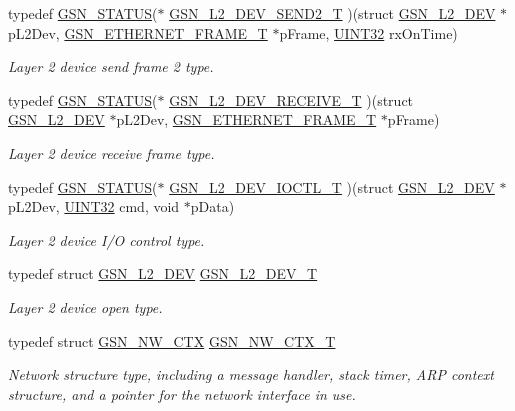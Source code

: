 \begin{DoxyCompactItemize}
typedef \hyperlink{a00660_gada5951904ac6110b1fa95e51a9ddc217}{GSN\_\-STATUS}($\ast$ \hyperlink{a00670_ga6bea88ae2a22023e68f1b064e1455411}{GSN\_\-L2\_\-DEV\_\-SEND2\_\-T} )(struct \hyperlink{a00107}{GSN\_\-L2\_\-DEV} $\ast$pL2Dev, \hyperlink{a00068}{GSN\_\-ETHERNET\_\-FRAME\_\-T} $\ast$pFrame, \hyperlink{a00660_gae1e6edbbc26d6fbc71a90190d0266018}{UINT32} rxOnTime)
\begin{DoxyCompactList}\small\item\em Layer 2 device send frame 2 type. \end{DoxyCompactList}\item 
typedef \hyperlink{a00660_gada5951904ac6110b1fa95e51a9ddc217}{GSN\_\-STATUS}($\ast$ \hyperlink{a00670_gaffd1598183dbe1898e975c2993aa4966}{GSN\_\-L2\_\-DEV\_\-RECEIVE\_\-T} )(struct \hyperlink{a00107}{GSN\_\-L2\_\-DEV} $\ast$pL2Dev, \hyperlink{a00068}{GSN\_\-ETHERNET\_\-FRAME\_\-T} $\ast$pFrame)
\begin{DoxyCompactList}\small\item\em Layer 2 device receive frame type. \end{DoxyCompactList}\item 
typedef \hyperlink{a00660_gada5951904ac6110b1fa95e51a9ddc217}{GSN\_\-STATUS}($\ast$ \hyperlink{a00670_gaeb9c0acdcf9376e138e61f00a424042a}{GSN\_\-L2\_\-DEV\_\-IOCTL\_\-T} )(struct \hyperlink{a00107}{GSN\_\-L2\_\-DEV} $\ast$pL2Dev, \hyperlink{a00660_gae1e6edbbc26d6fbc71a90190d0266018}{UINT32} cmd, void $\ast$pData)
\begin{DoxyCompactList}\small\item\em Layer 2 device I/O control type. \end{DoxyCompactList}\item 
typedef struct \hyperlink{a00107}{GSN\_\-L2\_\-DEV} \hyperlink{a00670_ga215517eb3a6f411a5378158abec2f574}{GSN\_\-L2\_\-DEV\_\-T}
\begin{DoxyCompactList}\small\item\em Layer 2 device open type. \end{DoxyCompactList}\item 
typedef struct \hyperlink{a00164}{GSN\_\-NW\_\-CTX} \hyperlink{a00670_ga086f6dd63b1ad2f2008312cc8c24b606}{GSN\_\-NW\_\-CTX\_\-T}
\begin{DoxyCompactList}\small\item\em Network structure type, including a message handler, stack timer, ARP context structure, and a pointer for the network interface in use. \end{DoxyCompactList}\item 

\end{DoxyCompactItemize}
